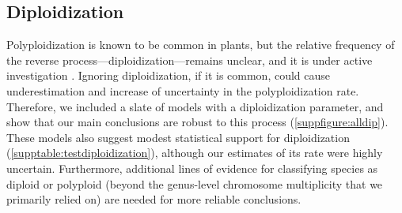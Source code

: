 
\subsection*{Diploidization}

Polyploidization is known to be common in plants, but the relative frequency of the reverse process---diploidization---remains unclear, and it is under active investigation \citep{dodsworth_2015,mandakova_2018}.
%
Ignoring diploidization, if it is common, could cause underestimation and increase of uncertainty in  the polyploidization rate. 
Therefore, we included a slate of models with a diploidization parameter, and show that our main conclusions are robust to this process (\cref{suppfigure:alldip}).
These models also suggest modest statistical support for diploidization (\cref{supptable:testdiploidization}), although our estimates of its rate were highly uncertain. 
Furthermore, additional lines of evidence for classifying species as diploid or polyploid (beyond the genus-level chromosome multiplicity that we primarily relied on) are needed for more reliable conclusions.



